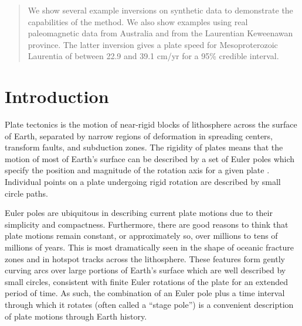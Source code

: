 \documentclass[preprint,12pt,authoryear]{elsarticle}
\begin{document}
\begin{frontmatter}
\begin{abstract}
We show several example inversions on synthetic data to demonstrate the capabilities of the method.
We also show examples using real paleomagnetic data from Australia and 
from the Laurentian Keweenawan province. The latter inversion gives a plate
speed for Mesoproterozoic Laurentia of between 22.9 and 39.1 cm/yr for a 95\% credible interval.
\end{abstract}

\begin{keyword}



\end{keyword}

\end{frontmatter}

\linenumbers

\section{Introduction}
\label{sec:introduction}

Plate tectonics is the motion of near-rigid blocks of lithosphere across the surface of Earth, 
separated by narrow regions of deformation in spreading centers, transform faults, and subduction zones.
The rigidity of plates means that the motion of most of Earth's surface
can be described by a set of Euler poles which specify the position and magnitude of the rotation axis for a
given plate \citep[cf.][]{cox2009plate}. Individual points on a plate undergoing
rigid rotation are described by small circle paths.

Euler poles are ubiquitous in describing current plate motions 
\citep[e.g.][]{demets1990current, argus2011geologically} due to their simplicity and compactness.
Furthermore, there are good reasons to think that plate motions remain constant, or approximately
so, over millions to tens of millions of years. This is most dramatically seen in the shape
of oceanic fracture zones and in hotspot tracks across the lithosphere. These features
form gently curving arcs over large portions of Earth's surface which are well described by small
circles, consistent with finite Euler rotations of the plate for an extended period of time.
As such, the combination of an Euler pole plus a time interval through which it rotates 
(often called a ``stage pole'') is a convenient description of plate motions through Earth history.
\end{document}
